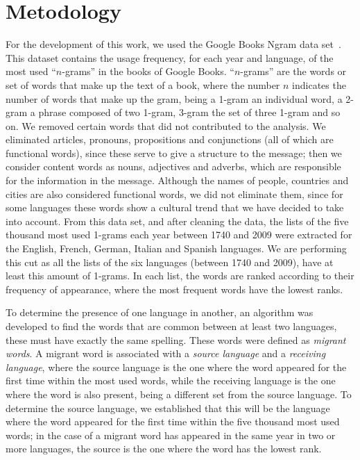 \documentclass[10pt,letterpaper]{article} %
\begin{document}
\section*{Metodology} %

For the development of this work,  we used the Google Books Ngram data set~\cite{ngramv}.
This dataset contains the usage frequency, for each year and language, of
the most used ``$n$-grams'' in the books of Google Books. 
``$n$-grams'' are the words or set of words that make up the text of a
book, where the number $n$ indicates the number of words that make up the gram,
being a 1-gram an individual word, a 2-gram a phrase composed of two 1-gram,
3-gram the set of three 1-gram and so on.
We removed certain words that did not contributed to the analysis. 
We eliminated articles, pronouns, propositions and conjunctions (all 
of which are functional words), since these
serve to give a structure to the message;  then we consider content words as
nouns, adjectives and adverbs, which are responsible for the information in the
message. Although the names of people, countries and cities are also considered
functional words, we did not eliminate them, since for some languages these
words show a cultural trend that we have decided to take into account. 
From this data set, and after cleaning the data, the lists of the five thousand
most used 1-grams each year
between 1740 and 2009 were extracted for the English, French, German, Italian
and Spanish languages.
We are performing this cut as all the lists of the six languages (between 1740
and 2009), have at least this amount of 1-grams.
In each list, the words are ranked according to their
frequency of appearance, where the most frequent words have the lowest ranks.

% 

To determine the presence of one language in another, an algorithm was
developed to find the words that are common between at least two languages,
these must have exactly the same spelling. These words were defined
as \textit{migrant words}. 
A migrant word is associated with a \textit{source language} and a
\textit{receiving language}, where the source language is the one where the
word appeared for the first time within the most used words,
while the receiving language is the one where the word is also present, being a
different set from the source language. 
To determine the source language, we established that this will be the language
where the word appeared for the first time within the five thousand most used
words; in the case of a migrant word has appeared in the same year in two or
more languages, the source is the one where the word has the lowest rank.
\end{document}
